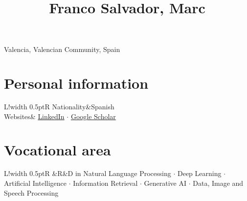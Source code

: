 \documentclass[10pt]{article}
\title{\bfseries\Huge Franco Salvador, Marc}
\date{}
\begin{document}
\begin{minipage}{0.65\textwidth}
\begingroup
\let\center\flushleft
\let\endcenter\endflushleft
\maketitle
\endgroup
\end{minipage}
\begin{minipage}{0.3\textwidth}
\end{minipage}

\begin{minipage}[ht]{0.48\textwidth}
Valencia, Valencian Community, Spain
\end{minipage}



\newcommand\VRule{\color{lightgray}\vrule width 0.5pt}

\section*{Personal information}
\begin{tabular}{L!{\VRule}R}
Nationality&Spanish\vspace{5pt}\\
Websites& \href{https://www.linkedin.com/in/marfrasa/en/}{LinkedIn} $\cdot$ \href{http://scholar.google.com/citations?user=tjhy5T8AAAAJ}{Google Scholar} \\
\end{tabular}

\section*{Vocational area}
\begin{tabular}{L!{\VRule}R}
&R\&D in Natural Language Processing $\cdot$ Deep Learning $\cdot$ Artificial Intelligence $\cdot$ Information Retrieval  $\cdot$ Generative AI $\cdot$ Data, Image and Speech Processing  \vspace{5pt}\\
\end{tabular}
\end{document}
